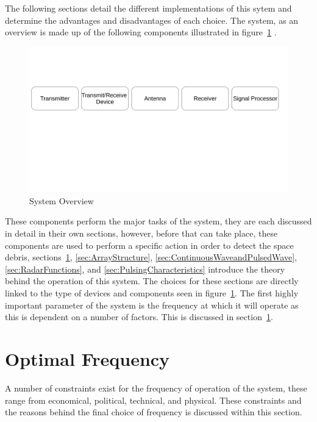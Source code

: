 \documentclass[11pt]{witseiepaper}
\begin{document}
The following sections detail the different implementations of this sytem and determine the advantages and disadvantages of each choice.
The system, as an overview is made up of the following components illustrated in figure~\ref{fig:SystemOverview} \cite{radarHandbook}.

\begin{center}
    \begin{figure}
        \includegraphics[width=\textwidth]{SystemOverview.pdf}
        \caption{System Overview}
        \label{fig:SystemOverview}    
    \end{figure}
\end{center}
These components perform the major tasks of the system, they are each discussed in detail in their own sections, however, before that can take place, these components are used to perform a specific action in order to detect the space debris, sections~\ref{sec:OptimalFrequency}, \ref{sec:ArrayStructure}, \ref{sec:ContinuousWaveandPulsedWave}, \ref{sec:RadarFunctions}, and \ref{sec:PulsingCharacteristics} introduce the theory behind the operation of this system. The choices for these sections are directly linked to the type of devices and components seen in figure~\ref{fig:SystemOverview}.
The first highly important parameter of the system is the frequency at which it will operate as this is dependent on a number of factors. This is discussed in section~\ref{sec:OptimalFrequency}.


\section{Optimal Frequency} \label{sec:OptimalFrequency}
A number of constraints exist for the frequency of operation of the system, these range from economical, political, technical, and physical. These constraints and the reasons behind the final choice of frequency is discussed within this section.
\end{document}
